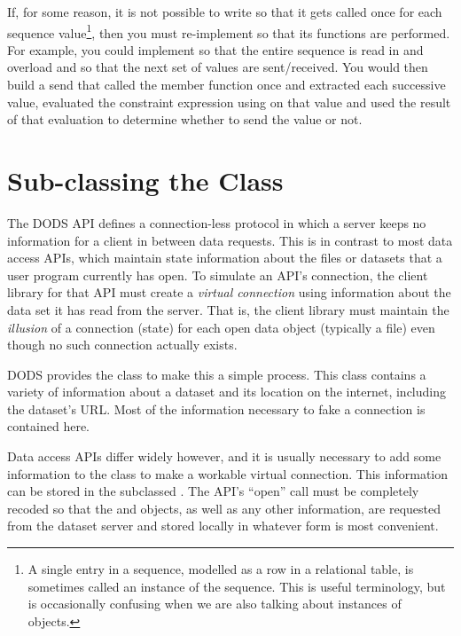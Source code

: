 If, for some reason, it is not possible to write  so that it
gets called once for each sequence value\footnote{A single entry in a
  sequence, modelled as a row in a relational table, is sometimes
  called an instance of the sequence.  This is useful terminology, but
  is occasionally confusing when we are also talking about instances
  of objects.}, then you must re-implement  so that its
functions are performed. For example, you could implement
 so that the entire sequence is read in and
overload  and  so
that the next set of values are sent/received. You would then build a
send that called the  member function once and
extracted each successive value, evaluated the constraint expression
using on that value and used the result of that evaluation to
determine whether to send the value or not.

\section{Sub-classing the  Class}
\label{tk,subclass-netio}

The DODS API defines a connection-less protocol in which a server
keeps no information for a client in between data requests.  This is
in contrast to most data access APIs, which maintain state information
about the files or datasets that a user program currently has open. To
simulate an API's connection, the client library for that API must
create a \emph{virtual connection} using information about the data
set it has read from the server.  That is, the client library must
maintain the \emph{illusion} of a connection (state) for each open
data object (typically a file) even though no such connection actually
exists.

DODS provides the  class to make this a simple process.
This class contains a variety of information about a dataset and its
location on the internet, including the dataset's URL.  Most of
the information necessary to fake a connection is contained here.

Data access APIs differ widely however, and it is usually necessary to
add some information to the  class to make a workable
virtual connection. This information can be stored in the subclassed
.  The API's ``open'' call must be completely recoded
so that the  and  objects, as well as any other
information, are requested from the dataset server and stored locally
in whatever form is most convenient.

